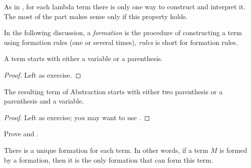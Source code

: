 \documentclass[../../../include/open-logic-section]{subfiles}
\begin{document}

As in , for each lambda term there is only one
way to construct and interpret it. The most of the part makes
sense only if this property holds.

In the following discussion, a \emph{formation} is the procedure of
constructing a term using formation rules (one or several times), \emph{rules} is short for
formation rules. 

\begin{lem}
  A term starts with either a variable or a parenthesis.
\end{lem}
\begin{proof}
  Left as exercise.
\end{proof}

\begin{lem}
  The resulting term of Abstraction starts with either two parenthesis or a
  parenthesis and a variable.
\end{lem}
\begin{proof}
  Left as exercise; you may want to use .
\end{proof}

\begin{prob}
  Prove  and .
\end{prob}

\begin{prop} 
There is a unique formation for each term. In other words, if a term
$M$ is formed by a formation, then it is the only formation that can form this term.
\end{prop}
\end{document}
